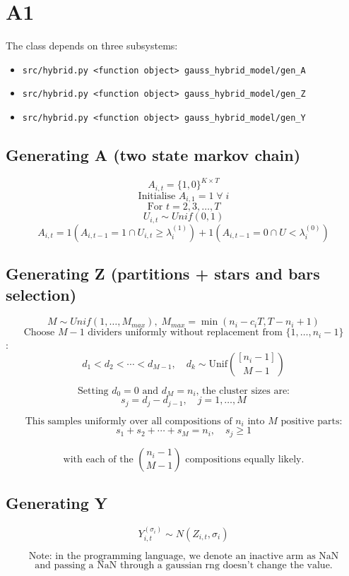 \documentclass{article}
\begin{document}
\section{A1}

The class depends on three subsystems:

\begin{itemize}
    \item \texttt{src/hybrid.py <function object> gauss\_hybrid\_model/gen\_A}
    \item \texttt{src/hybrid.py <function object> gauss\_hybrid\_model/gen\_Z}
    \item \texttt{src/hybrid.py <function object> gauss\_hybrid\_model/gen\_Y}
\end{itemize}

\subsection{Generating A (two state markov chain)}

$$A_{i, t} = \{1, 0\}^{K \times T}$$
$$\text{Initialise }A_{i, 1} = 1 \;\forall \;i$$
$$\text{For }t = 2, 3, \ldots, T$$
$$U_{i, t} \sim Unif(0, 1)$$
$$A_{i, t} = 1(A_{i, t-1} = 1 \cap U_{i, t} \geq \lambda_i^{(1)}) + 1(A_{i, t-1} = 0\cap U < \lambda_i^{(0)})$$

\subsection{Generating Z (partitions + stars and bars selection)}

$$M \sim Unif(1, \ldots , M_{max}), \; M_{max} = \min(n_i-c_i T, T - n_i + 1)$$
$$\text{Choose $M-1$ dividers uniformly without replacement from $\{1, \ldots, n_i - 1\}$}$$:
$$d_1 < d_2 < \cdots < d_{M-1}, \quad d_k \sim \text{Unif}\binom{[n_i-1]}{M-1}$$

$$\text{Setting $d_0 = 0$ and $d_M = n_i$, the cluster sizes are:}$$
$$s_j = d_j - d_{j-1}, \quad j = 1, \ldots, M$$

$$\text{This samples uniformly over all compositions of $n_i$ into $M$ positive parts:}$$
$$s_1 + s_2 + \cdots + s_M = n_i, \quad s_j \geq 1$$

$$\text{with each of the $\binom{n_i - 1}{M-1}$ compositions equally likely.}$$

\subsection{Generating Y}

$$Y_{i, t}^{(\sigma_i)} \sim N(Z_{i, t}, \sigma_i) $$

$$\text{Note: in the programming language, we denote an inactive arm as NaN}$$
$$\text{and passing a NaN through a gaussian rng doesn't change the value.}$$
\end{document}
